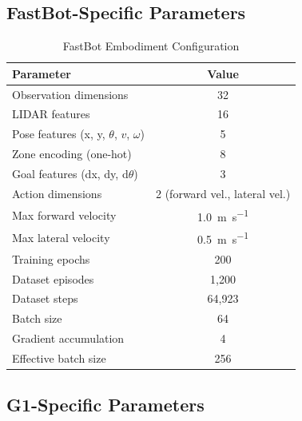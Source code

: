\documentclass[conference]{IEEEtran}
\begin{document}
\subsection{FastBot-Specific Parameters}

\begin{table}[h]
\centering
\caption{FastBot Embodiment Configuration}
\begin{tabular}{@{}lc@{}}
\toprule
\textbf{Parameter} & \textbf{Value} \\
\midrule
Observation dimensions & 32 \\
\quad LIDAR features & 16 \\
\quad Pose features (x, y, $\theta$, $v$, $\omega$) & 5 \\
\quad Zone encoding (one-hot) & 8 \\
\quad Goal features (dx, dy, d$\theta$) & 3 \\
Action dimensions & 2 (forward vel., lateral vel.) \\
Max forward velocity & \SI{1.0}{\metre\per\second} \\
Max lateral velocity & \SI{0.5}{\metre\per\second} \\
Training epochs & 200 \\
Dataset episodes & 1{,}200 \\
Dataset steps & 64{,}923 \\
Batch size & 64 \\
Gradient accumulation & 4 \\
Effective batch size & 256 \\
\bottomrule
\end{tabular}
\end{table}

\subsection{G1-Specific Parameters}
\end{document}
